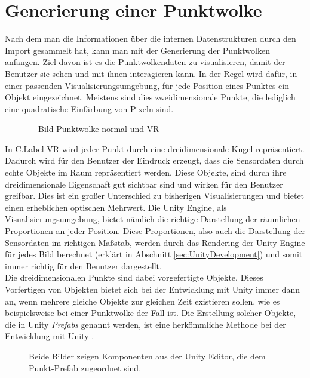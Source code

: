 \section{Generierung einer Punktwolke}
\label{sec:Generierung}
Nach dem man die Informationen über die internen Datenstrukturen durch den Import gesammelt hat, kann man mit der Generierung der Punktwolken anfangen. Ziel davon ist es die Punktwolkendaten zu visualisieren, damit der Benutzer sie sehen und mit ihnen interagieren kann. In der Regel wird dafür, in einer passenden Visualisierungsumgebung, für jede Position eines Punktes ein Objekt eingezeichnet. Meistens sind dies zweidimensionale Punkte, die lediglich eine quadratische Einfärbung von Pixeln sind. 

------------Bild Punktwolke normal und VR-------------

In C.Label-VR wird jeder Punkt durch eine dreidimensionale Kugel repräsentiert. Dadurch wird für den Benutzer der Eindruck erzeugt, dass die Sensordaten durch echte Objekte im Raum repräsentiert werden. Diese Objekte, sind durch ihre dreidimensionale Eigenschaft gut sichtbar sind und wirken für den Benutzer greifbar. Dies ist ein großer Unterschied zu bisherigen Visualisierungen und bietet einen erheblichen optischen Mehrwert. Die Unity Engine, als Visualisierungsumgebung, bietet nämlich die richtige Darstellung der räumlichen Proportionen an jeder Position. Diese Proportionen, also auch die Darstellung der Sensordaten im richtigen Maßstab, werden durch das Rendering der Unity Engine für jedes Bild berechnet (erklärt in Abschnitt \ref{sec:UnityDevelopment}) und somit immer richtig für den Benutzer dargestellt.\\

Die dreidimensionalen Punkte sind dabei vorgefertigte Objekte. Dieses Vorfertigen von Objekten bietet sich bei der Entwicklung mit Unity immer dann an, wenn mehrere gleiche Objekte zur gleichen Zeit existieren sollen, wie es beispielsweise bei einer Punktwolke der Fall ist. Die Erstellung solcher Objekte, die in Unity \textit{Prefabs} genannt werden, ist eine herkömmliche Methode bei der Entwicklung mit Unity \cite{bib:UnityPrefab}.\\ 

\begin{figure}%
    \centering
    \qquad
    \caption{Beide Bilder zeigen Komponenten aus der Unity Editor, die dem Punkt-Prefab zugeordnet sind.}
    \label{fig:Components}%
\end{figure}


